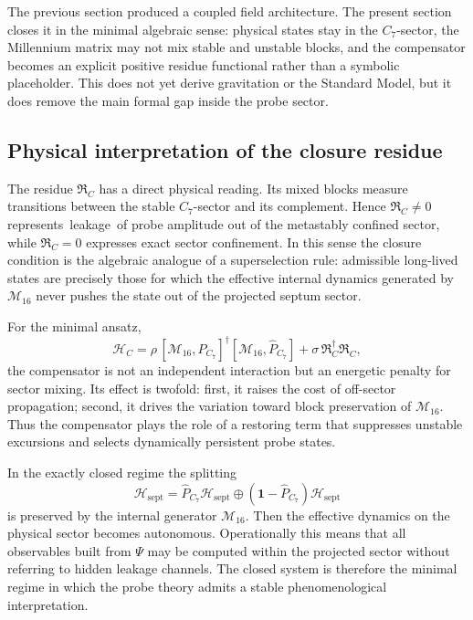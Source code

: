 \begin{remark}
The previous section produced a coupled field architecture.
The present section closes it in the minimal algebraic sense:
physical states stay in the $C_7$-sector, the Millennium matrix may not
mix stable and unstable blocks, and the compensator becomes an explicit
positive residue functional rather than a symbolic placeholder.
This does not yet derive gravitation or the Standard Model, but it does
remove the main formal gap inside the probe sector.
\end{remark}


\subsection*{Physical interpretation of the closure residue}

\begin{remark}
The residue $\mathfrak R_C$ has a direct physical reading.
Its mixed blocks measure transitions between the stable $C_7$-sector and
its complement.
Hence $\mathfrak R_C\neq 0$ represents \,leakage\, of probe amplitude out
of the metastably confined sector, while $\mathfrak R_C=0$ expresses exact
sector confinement.
In this sense the closure condition is the algebraic analogue of a
superselection rule: admissible long-lived states are precisely those for
which the effective internal dynamics generated by $\mathcal M_{16}$ never
pushes the state out of the projected septum sector.
\end{remark}

\begin{remark}
For the minimal ansatz,
\[
  \mathcal H_C
  = \rho\,[\mathcal M_{16},\hat P_{C_7}]^\dagger[\mathcal M_{16},\hat P_{C_7}]
    + \sigma\,\mathfrak R_C^\dagger\mathfrak R_C,
\]
the compensator is not an independent interaction but an energetic penalty
for sector mixing.
Its effect is twofold:
first, it raises the cost of off-sector propagation; second, it drives the
variation toward block preservation of $\mathcal M_{16}$.
Thus the compensator plays the role of a restoring term that suppresses
unstable excursions and selects dynamically persistent probe states.
\end{remark}

\begin{remark}
In the exactly closed regime the splitting
\[
  \mathcal H_{\mathrm{sept}}
  = \hat P_{C_7}\mathcal H_{\mathrm{sept}}
  \oplus
  (\mathbf 1-\hat P_{C_7})\mathcal H_{\mathrm{sept}}
\]
is preserved by the internal generator $\mathcal M_{16}$.
Then the effective dynamics on the physical sector becomes autonomous.
Operationally this means that all observables built from $\Psi$ may be
computed within the projected sector without referring to hidden leakage
channels.
The closed system is therefore the minimal regime in which the probe theory
admits a stable phenomenological interpretation.
\end{remark}

